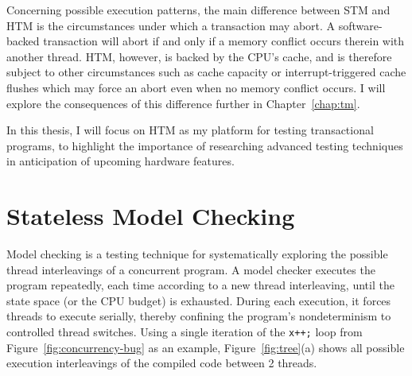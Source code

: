 Concerning possible execution patterns,
the main difference between STM and HTM is the circumstances under which a transaction may abort.
A software-backed transaction will abort if and only if a memory conflict occurs therein with another thread.
HTM, however, is backed by the CPU's cache, and is therefore subject to other circumstances such as cache capacity or interrupt-triggered cache flushes which may force an abort even when no memory conflict occurs.
I will explore the consequences of this difference further in Chapter~\ref{chap:tm}.

In this thesis, I will focus on HTM as my platform for testing transactional programs,
to highlight the importance of researching advanced testing techniques in anticipation of upcoming hardware features.


\section{Stateless Model Checking}

Model checking \cite{verisoft} is a testing technique for systematically exploring the possible thread interleavings of a concurrent program.
A model checker executes the program repeatedly, each time according to a new thread interleaving, until the state space (or the CPU budget) is exhausted.
During each execution, it forces threads to execute serially, thereby confining the program's nondeterminism to controlled thread switches.
Using a single iteration of the {\tt x++;} loop from Figure~\ref{fig:concurrency-bug} as an example,
Figure~\ref{fig:tree}(a) shows all possible execution interleavings of the compiled code between 2 threads.

